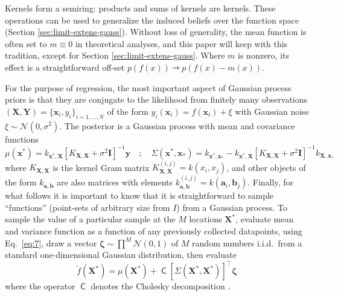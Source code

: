 \documentclass[twoside,11pt]{article}
\newcommand{\N}{\mathcal{N}}
\newcommand{\Trans}{^{\intercal}}
\newcommand{\vx}{\vec{x}}
\newcommand{\vy}{\vec{y}}
\newcommand{\vY}{\vec{Y}}
\newcommand{\vX}{\vec{X}}
\renewcommand{\vec}{\boldsymbol}
\newcommand{\Id}{\vec{I}}
\newcommand{\chol}{\operatorname{\mathsf{C}}}
\renewcommand{\to}{\rightarrowtriangle}
\begin{document}
Kernels form a semiring: products and sums of kernels are kernels.
These operations can be used to generalize the induced beliefs over
the function space (Section \ref{sec:limit-extens-gauss}). Without loss
of generality, the mean function is often set to $m\equiv 0$ in
theoretical analyses, and this paper will keep with this tradition,
except for Section \ref{sec:limit-extens-gauss}. Where $m$ is nonzero,
its effect is a straightforward off-set $p(f(x)) \to p(f(x)-m(x))$.

For the purpose of regression, the most important aspect of Gaussian
process priors is that they are conjugate to the likelihood from
finitely many observations $(\vX,\vY)=\{\vx_i,y_i\}_{i=1,\dots,N}$ of
the form $y_i(\vx_i)=f(\vx_i)+\xi$ with Gaussian noise $\xi\sim
\N(0,\sigma^2)$. The posterior is a Gaussian process with mean and
covariance functions
\begin{equation}
  \label{eq:7}
  \mu(\vx^*) = k_{\vx^*,\vX} [K_{\vX,\vX} + \sigma^{2}\Id]^{-1} \vy \quad;
  \quad \Sigma(\vx^*,\vx_*) = k_{\vx^*,\vx_*} - k_{\vx^*,\vX} [K_{\vX,\vX} +
  \sigma^{2}\Id]^{-1} k_{\vX,\vx_*}
\end{equation}
where $K_{\vX,\vX}$ is the kernel Gram matrix $K_{\vX,\vX}
^{(i,j)}=k(x_i,x_j)$, and other objects of the form
$k_{\vec{a},\vec{b}}$ are also matrices with elements
$k_{\vec{a},\vec{b}} ^{(i,j)} = k(\vec{a}_i,\vec{b}_j)$. Finally, for
what follows it is important to know that it is straightforward to
sample ``functions'' (point-sets of arbitrary size from $I$) from a
Gaussian process. To sample the value of a particular sample at the
$M$ locations $\vX^*$, evaluate mean and variance function as a
function of any previously collected datapoints, using Eq.\
\eqref{eq:7}, draw a vector $\vec{\zeta}\sim\prod ^M \N(0,1)$ of $M$
random numbers i.i.d.\ from a standard one-dimensional Gaussian
distribution, then evaluate
\begin{equation}
  \label{eq:8}
  \tilde{f}(\vX^*) = \mu(\vX^*) + \chol[\Sigma(\vX^*,\vX^*)]\Trans \vec{\zeta}
\end{equation}
where the operator $\chol$ denotes the Cholesky decomposition
\citep{Cholesky}.
\end{document}
